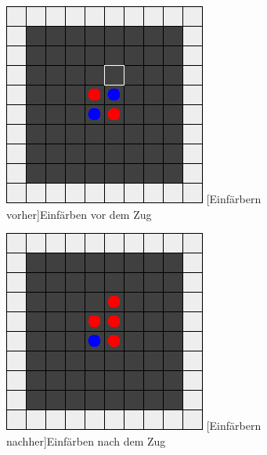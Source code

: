 \documentclass[12pt,a4paper,bibliography=totocnumbered,listof=totocnumbered]{article}
\begin{document}
\begin{figure}[H]
\centering
\begin{minipage}[c]{0.4\textwidth}
	\centering
	\includegraphics[width=\textwidth]{pics/reversi_original_map_capture_1.png}
	[Einfärbern vorher]{Einfärben vor dem Zug}
	\label{fig:capture_pre}
\end{minipage}
\hspace{0.1\textwidth}
\begin{minipage}[c]{0.4\textwidth}
	\centering
	\includegraphics[width=\textwidth]{pics/reversi_original_map_capture_2.png}
	[Einfärbern nachher]{Einfärben nach dem Zug}
	\label{fig:capture_post}
\end{minipage}
\end{figure}
\end{document}
